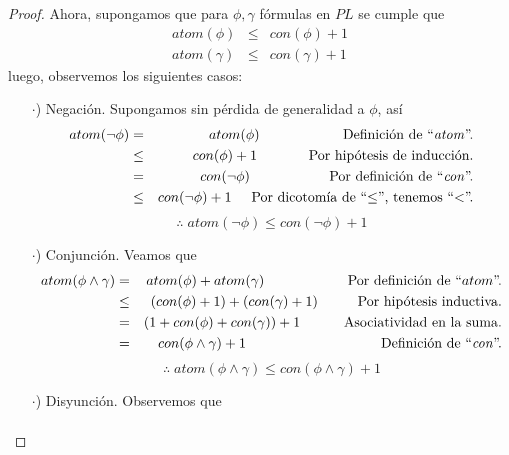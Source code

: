 \documentclass{article}
\begin{document}
\begin{enumerate}
\begin{itemize}
\begin{proof}
    Ahora, supongamos que para $\phi, \gamma$ fórmulas en $PL$ se cumple que
    \begin{eqnarray*}
      atom(\phi) &\leq& con(\phi) + 1\\
      atom(\gamma) &\leq& con(\gamma) + 1
    \end{eqnarray*}
    luego, observemos los siguientes casos:
    \begin{itemize}
    \item[$\cdot$)] Negación. Supongamos sin pérdida de generalidad a $\phi$, así
      \begin{eqnarray*}
        atom(\neg \phi) &=& atom(\phi)
        \hspace*{2.1cm} \text{Definición de ``\textit{atom}''.}\\
        &\leq& con(\phi) + 1
        \hspace*{1.3cm} \text{Por hipótesis de inducción.}\\
        &=& con(\neg \phi)
        \hspace*{2cm} \text{Por definición de ``\textit{con}''.}\\
        &\leq& con(\neg \phi) + 1
        \hspace*{0.5cm} \text{Por dicotomía de ``$\leq$'', tenemos ``$<$''.}
      \end{eqnarray*}
      \[
      \therefore \; atom(\neg \phi) \leq con(\neg \phi) + 1
      \]
    \item[$\cdot$)] Conjunción. Veamos que
      \begin{eqnarray*}
        atom(\phi \land \gamma) &=& atom(\phi) + atom(\gamma)
        \hspace*{2.1cm} \text{Por definición de ``$atom$''.}\\
        &\leq& (con(\phi) + 1) + (con(\gamma) + 1)
        \hspace*{1cm} \text{Por hipótesis inductiva.}\\
        &=& (1 + con(\phi) + con(\gamma)) + 1
        \hspace*{1.1cm} \text{Asociatividad en la suma.}\\
        &=& con(\phi \land \gamma) + 1
        \hspace*{3.4cm} \text{Definición de ``\textit{con}''.}
      \end{eqnarray*}
      \[
      \therefore \; atom(\phi \land \gamma) \leq con(\phi \land \gamma) + 1
      \]
    \item[$\cdot$)] Disyunción. Observemos que
      \begin{eqnarray*}

\end{eqnarray*}
\end{itemize}
\end{proof}
\end{itemize}
\end{enumerate}
\end{document}
